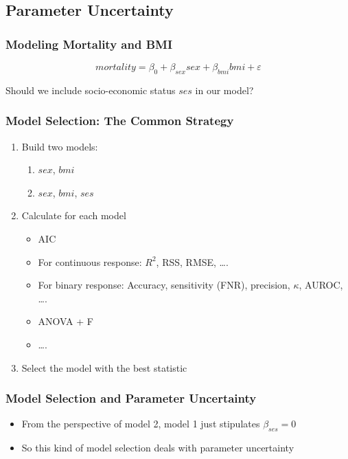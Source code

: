 \documentclass{philslides}
\begin{document}
\subsection{Parameter Uncertainty}
\frame
{
	\frametitle{Modeling Mortality and BMI}
	\[mortality = \beta_0 + \beta_{sex} sex + \beta_{bmi} bmi + \varepsilon\]
	\pause
	
	Should we include socio-economic status $ses$ in our model?  
}
\frame
{
	\frametitle{Model Selection: The Common Strategy}
	\begin{enumerate}
	\item Build two models:
		\begin{enumerate}
		\item $sex$, $bmi$
		\item $sex$, $bmi$, $ses$
		\end{enumerate}
	\item Calculate  for each model
		\begin{itemize}
		\item AIC \autocite[131ff]{Sober2015}
		\item For continuous response:  $R^2$, RSS, RMSE, \ldots.
		\item For binary response:  Accuracy, sensitivity (FNR), precision, $\kappa$, AUROC, \ldots.
		\item ANOVA + F
		\item \ldots.
		\end{itemize}
	\item Select the model with the best statistic
	\end{enumerate}
}
\frame
{
	\frametitle{Model Selection and Parameter Uncertainty}
	\begin{itemize}
		\item From the perspective of model 2, model 1 just stipulates $\beta_{ses} = 0$
		\item So this kind of model selection deals with parameter uncertainty
	\end{itemize}
}
\end{document}

